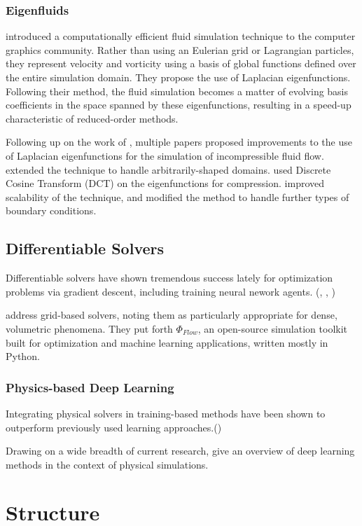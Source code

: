 \subsubsection*{Eigenfluids}
\cite{dewitt} introduced a computationally efficient fluid simulation technique
to the computer graphics community. Rather than using an Eulerian grid or
Lagrangian particles, they represent velocity and vorticity using a basis of
global functions defined over the entire simulation domain. They propose the use
of Laplacian eigenfunctions. Following their method, the fluid simulation
becomes a matter of evolving basis coefficients in the space spanned by
these eigenfunctions, resulting in a speed-up characteristic of reduced-order
methods.

Following up on the work of \cite{dewitt}, multiple papers proposed improvements
to the use of Laplacian eigenfunctions for the simulation of incompressible
fluid flow. \cite{ModelReductionFluidSim} extended the technique to handle
arbitrarily-shaped domains. \cite{EigenfluidCompression} used Discrete Cosine
Transform (DCT) on the eigenfunctions for compression.
\cite{scalable-eigenfluids} improved scalability of the technique, and modified
the method to handle further types of boundary conditions.

\subsection{Differentiable Solvers}
Differentiable solvers have shown tremendous success lately for optimization
problems via gradient descent, including training neural nework agents.
(\cite{holl2019pdecontrol}, \cite{difftaichi}, \cite{warp2022})


\cite{holl2019pdecontrol} address grid-based solvers, noting them as
particularly appropriate for dense, volumetric phenomena. They put forth
$\Phi_{Flow}$, an open-source simulation toolkit built for optimization and
machine learning applications, written mostly in Python.

\subsubsection*{Physics-based Deep Learning}
Integrating physical solvers in training-based methods have been shown to
outperform previously used learning approaches.(\cite{solver-in-the-loop})

Drawing on a wide breadth of current research, \cite{pbdl} give an overview of
deep learning methods in the context of physical simulations. 


\section{Structure}

